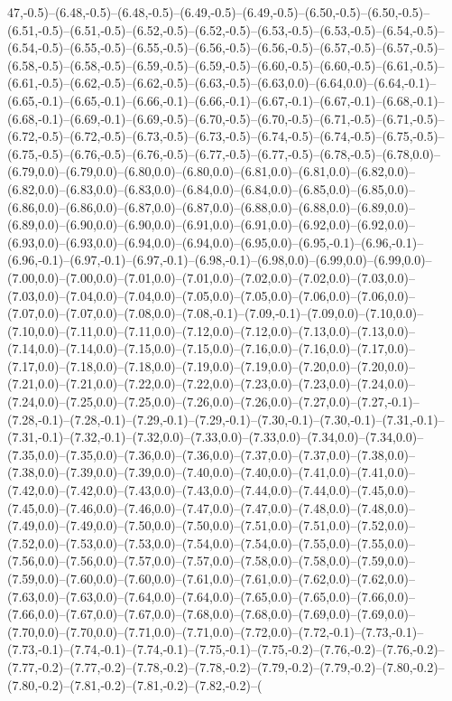 47,-0.5)--(6.48,-0.5)--(6.48,-0.5)--(6.49,-0.5)--(6.49,-0.5)--(6.50,-0.5)--(6.50,-0.5)--(6.51,-0.5)--(6.51,-0.5)--(6.52,-0.5)--(6.52,-0.5)--(6.53,-0.5)--(6.53,-0.5)--(6.54,-0.5)--(6.54,-0.5)--(6.55,-0.5)--(6.55,-0.5)--(6.56,-0.5)--(6.56,-0.5)--(6.57,-0.5)--(6.57,-0.5)--(6.58,-0.5)--(6.58,-0.5)--(6.59,-0.5)--(6.59,-0.5)--(6.60,-0.5)--(6.60,-0.5)--(6.61,-0.5)--(6.61,-0.5)--(6.62,-0.5)--(6.62,-0.5)--(6.63,-0.5)--(6.63,0.0)--(6.64,0.0)--(6.64,-0.1)--(6.65,-0.1)--(6.65,-0.1)--(6.66,-0.1)--(6.66,-0.1)--(6.67,-0.1)--(6.67,-0.1)--(6.68,-0.1)--(6.68,-0.1)--(6.69,-0.1)--(6.69,-0.5)--(6.70,-0.5)--(6.70,-0.5)--(6.71,-0.5)--(6.71,-0.5)--(6.72,-0.5)--(6.72,-0.5)--(6.73,-0.5)--(6.73,-0.5)--(6.74,-0.5)--(6.74,-0.5)--(6.75,-0.5)--(6.75,-0.5)--(6.76,-0.5)--(6.76,-0.5)--(6.77,-0.5)--(6.77,-0.5)--(6.78,-0.5)--(6.78,0.0)--(6.79,0.0)--(6.79,0.0)--(6.80,0.0)--(6.80,0.0)--(6.81,0.0)--(6.81,0.0)--(6.82,0.0)--(6.82,0.0)--(6.83,0.0)--(6.83,0.0)--(6.84,0.0)--(6.84,0.0)--(6.85,0.0)--(6.85,0.0)--(6.86,0.0)--(6.86,0.0)--(6.87,0.0)--(6.87,0.0)--(6.88,0.0)--(6.88,0.0)--(6.89,0.0)--(6.89,0.0)--(6.90,0.0)--(6.90,0.0)--(6.91,0.0)--(6.91,0.0)--(6.92,0.0)--(6.92,0.0)--(6.93,0.0)--(6.93,0.0)--(6.94,0.0)--(6.94,0.0)--(6.95,0.0)--(6.95,-0.1)--(6.96,-0.1)--(6.96,-0.1)--(6.97,-0.1)--(6.97,-0.1)--(6.98,-0.1)--(6.98,0.0)--(6.99,0.0)--(6.99,0.0)--(7.00,0.0)--(7.00,0.0)--(7.01,0.0)--(7.01,0.0)--(7.02,0.0)--(7.02,0.0)--(7.03,0.0)--(7.03,0.0)--(7.04,0.0)--(7.04,0.0)--(7.05,0.0)--(7.05,0.0)--(7.06,0.0)--(7.06,0.0)--(7.07,0.0)--(7.07,0.0)--(7.08,0.0)--(7.08,-0.1)--(7.09,-0.1)--(7.09,0.0)--(7.10,0.0)--(7.10,0.0)--(7.11,0.0)--(7.11,0.0)--(7.12,0.0)--(7.12,0.0)--(7.13,0.0)--(7.13,0.0)--(7.14,0.0)--(7.14,0.0)--(7.15,0.0)--(7.15,0.0)--(7.16,0.0)--(7.16,0.0)--(7.17,0.0)--(7.17,0.0)--(7.18,0.0)--(7.18,0.0)--(7.19,0.0)--(7.19,0.0)--(7.20,0.0)--(7.20,0.0)--(7.21,0.0)--(7.21,0.0)--(7.22,0.0)--(7.22,0.0)--(7.23,0.0)--(7.23,0.0)--(7.24,0.0)--(7.24,0.0)--(7.25,0.0)--(7.25,0.0)--(7.26,0.0)--(7.26,0.0)--(7.27,0.0)--(7.27,-0.1)--(7.28,-0.1)--(7.28,-0.1)--(7.29,-0.1)--(7.29,-0.1)--(7.30,-0.1)--(7.30,-0.1)--(7.31,-0.1)--(7.31,-0.1)--(7.32,-0.1)--(7.32,0.0)--(7.33,0.0)--(7.33,0.0)--(7.34,0.0)--(7.34,0.0)--(7.35,0.0)--(7.35,0.0)--(7.36,0.0)--(7.36,0.0)--(7.37,0.0)--(7.37,0.0)--(7.38,0.0)--(7.38,0.0)--(7.39,0.0)--(7.39,0.0)--(7.40,0.0)--(7.40,0.0)--(7.41,0.0)--(7.41,0.0)--(7.42,0.0)--(7.42,0.0)--(7.43,0.0)--(7.43,0.0)--(7.44,0.0)--(7.44,0.0)--(7.45,0.0)--(7.45,0.0)--(7.46,0.0)--(7.46,0.0)--(7.47,0.0)--(7.47,0.0)--(7.48,0.0)--(7.48,0.0)--(7.49,0.0)--(7.49,0.0)--(7.50,0.0)--(7.50,0.0)--(7.51,0.0)--(7.51,0.0)--(7.52,0.0)--(7.52,0.0)--(7.53,0.0)--(7.53,0.0)--(7.54,0.0)--(7.54,0.0)--(7.55,0.0)--(7.55,0.0)--(7.56,0.0)--(7.56,0.0)--(7.57,0.0)--(7.57,0.0)--(7.58,0.0)--(7.58,0.0)--(7.59,0.0)--(7.59,0.0)--(7.60,0.0)--(7.60,0.0)--(7.61,0.0)--(7.61,0.0)--(7.62,0.0)--(7.62,0.0)--(7.63,0.0)--(7.63,0.0)--(7.64,0.0)--(7.64,0.0)--(7.65,0.0)--(7.65,0.0)--(7.66,0.0)--(7.66,0.0)--(7.67,0.0)--(7.67,0.0)--(7.68,0.0)--(7.68,0.0)--(7.69,0.0)--(7.69,0.0)--(7.70,0.0)--(7.70,0.0)--(7.71,0.0)--(7.71,0.0)--(7.72,0.0)--(7.72,-0.1)--(7.73,-0.1)--(7.73,-0.1)--(7.74,-0.1)--(7.74,-0.1)--(7.75,-0.1)--(7.75,-0.2)--(7.76,-0.2)--(7.76,-0.2)--(7.77,-0.2)--(7.77,-0.2)--(7.78,-0.2)--(7.78,-0.2)--(7.79,-0.2)--(7.79,-0.2)--(7.80,-0.2)--(7.80,-0.2)--(7.81,-0.2)--(7.81,-0.2)--(7.82,-0.2)--(